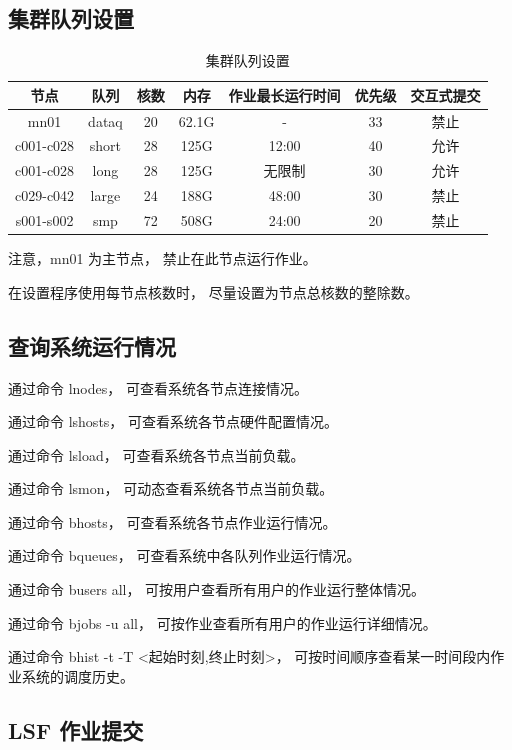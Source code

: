 \documentclass[UTF8]{ctexart}
\newcommand{\mynote}[1]{\colorbox{gray!35}{#1}}
\newcommand{\mynnote}[1]{\colorbox{gray!15}{\color{blue!65}#1}}
\begin{document}
\subsection{集群队列设置}
\begin{table}[h]
  \centering
  \caption{集群队列设置}
  \begin{tabular*}{400pt}{@{\extracolsep{\fill}}ccccccc}
    \toprule
    节点      & 队列  & 核数 & 内存  & 作业最长运行时间 & 优先级 & 交互式提交 \\
    \midrule
    mn01      & dataq & 20   & 62.1G & -      & 33 & 禁止 \\
    c001-c028 & short & 28   & 125G  & 12:00  & 40 & 允许 \\
    c001-c028 & long  & 28   & 125G  & 无限制 & 30 & 允许 \\
    c029-c042 & large & 24   & 188G  & 48:00  & 30 & 禁止 \\
    s001-s002 & smp   & 72   & 508G  & 24:00  & 20 & 禁止 \\
    \bottomrule
  \end{tabular*}
\end{table}

注意，\mynote{mn01} 为主节点，
禁止在此节点运行作业。

在设置程序使用每节点核数时，
尽量设置为节点总核数的整除数。

\subsection{查询系统运行情况}
通过命令 \mynnote{lnodes}，
可查看系统各节点连接情况。

通过命令 \mynnote{lshosts}，
可查看系统各节点硬件配置情况。

通过命令 \mynnote{lsload}，
可查看系统各节点当前负载。

通过命令 \mynnote{lsmon}，
可动态查看系统各节点当前负载。

通过命令 \mynnote{bhosts}，
可查看系统各节点作业运行情况。

通过命令 \mynnote{bqueues}，
可查看系统中各队列作业运行情况。

通过命令 \mynnote{busers all}，
可按用户查看所有用户的作业运行整体情况。

通过命令 \mynnote{bjobs -u all}，
可按作业查看所有用户的作业运行详细情况。

通过命令 \mynnote{bhist -t -T <起始时刻,终止时刻>}，
可按时间顺序查看某一时间段内作业系统的调度历史。

\subsection{LSF 作业提交}
\end{document}
